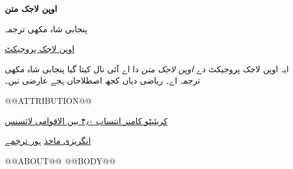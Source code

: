 \documentclass[12pt,a4paper,oneside,openany]{memoir}
\newcommand*{\olpath}{upstream}
\begin{document}
\pnbEnableSharedLabels
{}\relax
\frontmatter
\begin{titlingpage}
\centering
\vspace*{0.15\textheight}
{\Huge\bfseries اوپن لاجک متن\par}
\vspace{1em}
{\Large پنجابی شاہ مکھی ترجمہ\par}
\vspace{2em}
{\large \href{https://openlogicproject.org/people/}{اوپن لاجک پروجیکٹ}\par}
\vfill
ایہ اوپن لاجک پروجیکٹ دے \textit{اوپن لاجک متن} دا اے آئی نال کیتا
گیا پنجابی شاہ مکھی ترجمہ اے۔ ریاضی دیاں کجھ اصطلاحاں ہجے عارضی نیں۔
\par
@@ATTRIBUTION@@
\par
\href{https://creativecommons.org/licenses/by/4.0/}
  {کریئیٹو کامنز انتساب ۴٫۰ بین الاقوامی لائسنس}
\par
\href{https://github.com/OpenLogicProject/OpenLogic/tree/9620cc73f9c8e0ad003c514a5d3748f29611c4c0}
  {انگریزی ماخذ}
\quad
\href{https://github.com/KokunoYumeto/OpenLogic-translations}{ہور ترجمے}
\end{titlingpage}
@@ABOUT@@
\setpnumwidth{3em}
\setrmarg{4em}
\tableofcontents*
\mainmatter
@@BODY@@
\backmatter

\begin{otherlanguage}{english}
\renewcommand{\bibname}{\foreignlanguage{urdu}{حوالیاں دی فہرست}}
\nocite{Frege1953,Peter1967}

\end{otherlanguage}
\end{document}
